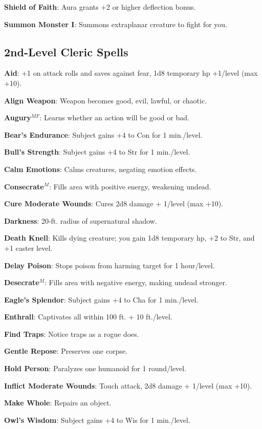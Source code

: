 \textbf{Shield of Faith}: Aura grants +2 or higher deflection bonus.

\textbf{Summon Monster I}: Summons extraplanar creature to fight for you.

\subsection{2nd-Level Cleric Spells}


\textbf{Aid}: +1 on attack rolls and saves against fear, 1d8 temporary hp +1/level (max +10).

\textbf{Align Weapon}: Weapon becomes good, evil, lawful, or chaotic.

\textbf{Augury}\(^{MF}\): Learns whether an action will be good or bad.

\textbf{Bear's Endurance}: Subject gains +4 to Con for 1 min./level.

\textbf{Bull's Strength}: Subject gains +4 to Str for 1 min./level.

\textbf{Calm Emotions}: Calms creatures, negating emotion effects.

\textbf{Consecrate}\(^{M}\): Fills area with positive energy, weakening undead.

\textbf{Cure Moderate Wounds}: Cures 2d8 damage + 1/level (max +10).

\textbf{Darkness}: 20-ft. radius of supernatural shadow.

\textbf{Death Knell}: Kills dying creature; you gain 1d8 temporary hp, +2 to Str, and +1 caster level.

\textbf{Delay Poison}: Stops poison from harming target for 1 hour/level.

\textbf{Desecrate}\(^{M}\): Fills area with negative energy, making undead stronger.

\textbf{Eagle's Splendor}: Subject gains +4 to Cha for 1 min./level.

\textbf{Enthrall}: Captivates all within 100 ft. + 10 ft./level.

\textbf{Find Traps}: Notice traps as a rogue does.

\textbf{Gentle Repose}: Preserves one corpse.

\textbf{Hold Person}: Paralyzes one humanoid for 1 round/level.

\textbf{Inflict Moderate Wounds}: Touch attack, 2d8 damage + 1/level (max +10).

\textbf{Make Whole}: Repairs an object.

\textbf{Owl's Wisdom}: Subject gains +4 to Wis for 1 min./level.

